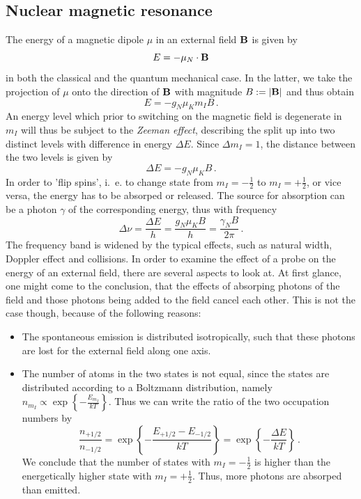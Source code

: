 \subsection{Nuclear magnetic resonance}
The energy of a magnetic dipole $\mu$ in an external field $\mathbf{B}$ is given by 
\begin{equation}
    E = - \mu_N \cdot \mathbf{B}
\end{equation}
in both the classical and the quantum mechanical case. In the latter, 
we take the projection of $\mu$ onto the direction of $\mathbf{B}$ with magnitude 
$B := |\mathbf{B}|$ and thus obtain 
\begin{equation}
    E = - g_N \mu_K m_I B \, .
\end{equation}
An energy level which prior to switching on the magnetic field is degenerate in $m_I$ 
will thus be subject to the \emph{Zeeman effect}, describing the split up into two 
distinct levels with difference in energy $\Delta E$. Since $\Delta m_I = 1$, the 
distance between the two levels is given by 
\begin{equation}
    \Delta E = - g_N \mu_K B \, .
\end{equation}
In order to 'flip spins', i.~e. to change state from $m_I = - \frac{1}{2}$ to $m_I = + \frac{1}{2}$, 
or vice versa, the energy has to be absorped or released. The source for absorption can be a photon $\gamma$
of the corresponding energy, thus with frequency 
\begin{equation}
    \Delta \nu = \frac{\Delta E}{h} = \frac{g_N \mu_K B}{h} = \frac{\gamma_N B}{2 \pi}\, .
\end{equation}
The frequency band is widened by the typical effects, such as natural width, Doppler effect 
and collisions. 
In order to examine the effect of a probe on the energy of an external field, there are several
aspects to look at. At first glance, one might come to the conclusion, that the effects of 
absorping photons of the field and those photons being added to the field cancel each other. 
This is not the case though, because of the following reasons:
\begin{itemize}
    \item
        The spontaneous emission is distributed isotropically, such that these photons are lost for 
        the external field along one axis.
    \item
        The number of atoms in the two states is not equal, since the states are distributed according to 
        a Boltzmann distribution, namely $n_{m_I} \propto \exp\left\{-\frac{E_{m_I}}{kT}\right\}$. 
        Thus we can write the ratio of the two occupation numbers by
        \begin{equation}
            \frac{n_{+1/2}}{n_{-1/2}} 
                = \exp\left\{-\frac{E_{+1/2} - E_{-1/2}}{kT} \right\}
                = \exp\left\{-\frac{\Delta E}{kT} \right\} \, .
        \end{equation}
        We conclude that the number of states with $m_I = -\frac{1}{2}$ is higher than the energetically 
        higher state with $m_I = +\frac{1}{2}$. Thus, more photons are absorped than emitted. 
\end{itemize}
